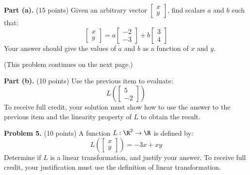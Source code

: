 \documentclass[12pt]{article}
\begin{document}
\textbf{Part (a).} (15 points) Given an arbitrary vector $\begin{bmatrix}x\\y\end{bmatrix}$, find scalars $a$ and $b$ such that:
\[
\begin{bmatrix}x\\y\end{bmatrix}=a\left[\begin{matrix}-2\\-3\end{matrix}\right]+b\left[\begin{matrix}3\\4\end{matrix}\right]
\]
Your answer should give the values of $a$ and $b$ as a function of $x$ and $y$.

\vfill
(This problem continues on the next page.)

\clearpage

\textbf{Part (b).} (10 points) Use the previous item to evaluate:
\[
L\left(\begin{bmatrix}5\\-2\end{bmatrix}\right)
\]
To receive full credit, your solution must show how to use the answer to the previous item and the linearity property of $L$ to obtain the result. 

\clearpage

\textbf{Problem 5.} (10 points) A function $L:\R^2\to\R$ is defined by:
\[
L\left(\begin{bmatrix}x\\y\end{bmatrix}\right)=-3x+xy
\]
Determine if $L$ is a linear transformation, and justify your answer. To receive full credit, your justification must use the definition of linear transformation.
\end{document}
